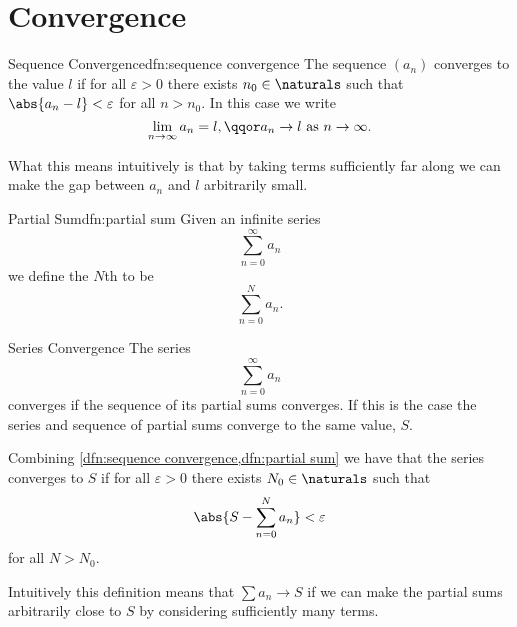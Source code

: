 \documentclass[fleqn]{NotesClass}
\begin{document}
    \section{Convergence}
    \begin{dfn}{Sequence Convergence}{dfn:sequence convergence}
        The sequence \((a_n)\) converges to the value \(l\) if for all \(\varepsilon>0\) there exists \(n_0\in\naturals\) such that \(\abs{a_n - l} < \varepsilon\) for all \(n > n_0\).
        In this case we write
        \begin{equation}
            \lim_{n\to\infty} a_n = l, \qqor a_n \to l\text{ as } n\to\infty.
        \end{equation}
    \end{dfn}
    What this means intuitively is that by taking terms sufficiently far along we can make the gap between \(a_n\) and \(l\) arbitrarily small.
    
    \begin{dfn}{Partial Sum}{dfn:partial sum}
        Given an infinite series
        \begin{equation}
            \sum_{n=0}^{\infty} a_n
        \end{equation}
        we define the \(N\)th  to be
        \begin{equation}
            \sum_{n=0}^{N}a_n.
        \end{equation}
    \end{dfn}
    
    \begin{dfn}{Series Convergence}{}
        The series
        \begin{equation}
            \sum_{n=0}^{\infty} a_n
        \end{equation}
        converges if the sequence of its partial sums converges.
        If this is the case the series and sequence of partial sums converge to the same value, \(S\).
        
        Combining \cref{dfn:sequence convergence,dfn:partial sum} we have that the series converges to \(S\) if for all \(\varepsilon>0\) there exists \(N_0\in\naturals\) such that
        \begin{equation}
            \abs{S - \sum_{n=0}^{N}a_n} < \varepsilon
        \end{equation}
        for all \(N > N_0\).
    \end{dfn}
    Intuitively this definition means that \(\sum a_n \to S\) if we can make the partial sums arbitrarily close to \(S\) by considering sufficiently many terms.
    
\end{document}
